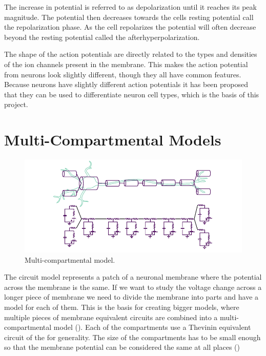 \documentclass[altfont, fleqn]{uiophd}
\renewcommand{\cref}[1]{{\color{viridis_03}\mycref{#1}}}
\begin{document}
The increase in potential is referred to as depolarization
until it reaches its peak magnitude. 
The potential then decreases towards the cells resting potential
call the repolarization phase. 
As the cell repolarizes the potential will often decrease beyond the resting
potential called the afterhyperpolarization. 

The shape of the action potentials are directly 
related to the types and densities
of the ion channels present in the membrane. 
This makes the action potential from neurons look slightly different, 
though they all have common features. 
Because neurons have slightly different action potentials
it has been proposed that they can be used to differentiate
neuron cell types, which is the basis of this project. 

\section{Multi-Compartmental Models}
\begin{figure}[h]
    \centering
    \includegraphics[width=1.0\textwidth]{images/sec_2/compartments.pdf}
    \caption{Multi-compartmental model.}
    \label{fig:2_comp_mod}
\end{figure}
The circuit model represents a patch of a neuronal membrane
where the potential across the membrane is the same. 
If we want to study the voltage change across a longer piece of 
membrane we need to divide the membrane into parts and have a model for
each of them. 
This is the basis for creating bigger models, where multiple pieces
of membrane equivalent circuits are combined into a multi-compartmental
model
(\cref{fig:2_comp_mod}).
Each of the compartments use a Thevinin equivalent circuit 
of the for generality.  
The size of the compartments has to be small enough so that the membrane potential
can be considered the same at all places
(\textcite{sterratt_principles_2011})
\end{document}
